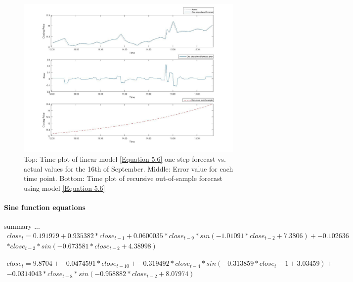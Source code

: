 \documentclass[13pt]{report}
\begin{document}
\begin{figure}[H]
\centering
\label{VWlinear16fig}
\includegraphics[width=\textwidth]{16linear2}
\caption{Top: Time plot of linear model \ref{Equation 5.6} one-step forecast vs. actual values for the 16th of September. Middle: Error value for each time point. Bottom: Time plot of recursive out-of-sample forecast using model \ref{Equation 5.6}}
\end{figure}

\paragraph{Sine function equations}\hfill \break
summary ...
\begin{equation}
\begin{align*}
close_{t} = 0.191979 + 0.935382 * close_{t-1} + 0.0600035 * close_{t-9} * sin ( -1.01091 * close_{t-2} + 7.3806 ) + -0.102636\\ * close_{t-2} * sin ( -0.673581 * close_{t-2} + 4.38998 )
\end{align*}
\label{Equation 5.7}
\end{equation}

\begin{equation}
\begin{align*}
close_{t} = 9.8704 + -0.0474591 * close_{t-10} + -0.319492 * close_{t-4} * sin ( -0.313859 * close_t-1 + 3.03459 ) + \\-0.0314043 * close_{t-8} * sin ( -0.958882 * close_{t-2} + 8.07974 )
\end{align*}
\label{Equation 5.8}
\end{equation}
\end{document}
